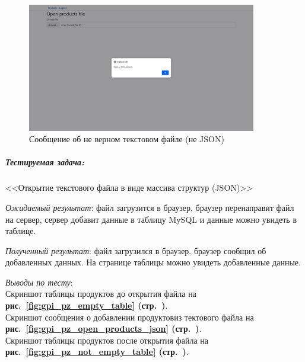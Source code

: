 \begin{figure}[!htb]
    \centering
    \includegraphics[width=10cm]
        {_assets/gpi_pz_error_open_file.png}
    \caption{Сообщение об не верном текстовом файле (не JSON)}
    \label{fig:gpi_pz_error_open_file}
\end{figure}


\newpage

\subparagraph{Тестируемая задача:} <<Открытие текстового файла в виде массива структур (JSON)>>

\textit{Ожидаемый результат}: файл загрузится в браузер, браузер перенаправит файл на сервер,
сервер добавит данные в таблицу MySQL и данные можно увидеть в таблице.

\textit{Полученный результат}: файл загрузился в браузер, браузер сообщил об добавленных данных.
На странице таблицы можно увидеть добавленные данные.

\textit{Выводы по тесту}:\\
Скриншот таблицы продуктов до открытия файла на
\textbf{рис.~\ref{fig:gpi_pz_empty_table} (стр.~\pageref{fig:gpi_pz_empty_table})}.\\
Скриншот сообщения о добавлении продуктовиз тектового файла на
\textbf{рис.~\ref{fig:gpi_pz_open_products_json} (стр.~\pageref{fig:gpi_pz_open_products_json})}.\\
Скриншот таблицы продуктов после открытия файла на
\textbf{рис.~\ref{fig:gpi_pz_not_empty_table} (стр.~\pageref{fig:gpi_pz_not_empty_table})}.

